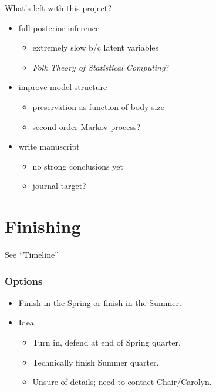 \documentclass{beamer}
\begin{document}
\begin{frame}
  \begin{block}{What's left with this project?}
    \begin{itemize}
      \item full posterior inference
        \begin{itemize}
          \item extremely slow b/c latent variables
          \item \textit{Folk Theory of Statistical Computing}?
        \end{itemize}
      \item improve model structure
        \begin{itemize}
          \item preservation as function of body size
          \item second-order Markov process?
        \end{itemize}
      \item write manuscript
        \begin{itemize}
          \item no strong conclusions yet
          \item journal target?
        \end{itemize}
    \end{itemize}
  \end{block}
\end{frame}


\section{Finishing}
\begin{frame}
  \begin{huge}
    See ``Timeline''
  \end{huge}
\end{frame}

\begin{frame}
  \frametitle{Options}
  \begin{itemize}
    \item Finish in the Spring or finish in the Summer.
    \item Idea
      \begin{itemize}
        \item Turn in, defend at end of Spring quarter.
        \item Technically finish Summer quarter.
        \item Unsure of details; need to contact Chair/Carolyn.
      \end{itemize}
  \end{itemize}
\end{frame}
\end{document}
